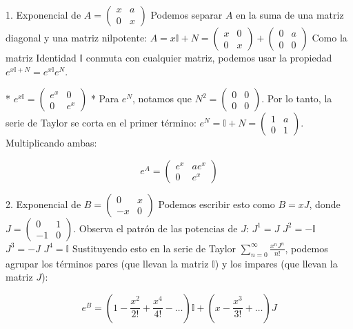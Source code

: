 \documentclass[11pt,spanish]{article}
\begin{document}
1. Exponencial de $A = \begin{pmatrix} x & a \\ 0 & x \end{pmatrix}$ 
Podemos separar $A$ en la suma de una matriz diagonal y una matriz nilpotente:
$A = x\mathbb{I} + N = \begin{pmatrix} x & 0 \\ 0 & x \end{pmatrix} + \begin{pmatrix} 0 & a \\ 0 & 0 \end{pmatrix}$
Como la matriz Identidad $\mathbb{I}$ conmuta con cualquier matriz, podemos usar la propiedad $e^{x\mathbb{I}+N} = e^{x\mathbb{I}}e^{N}$.

* $e^{x\mathbb{I}} = \begin{pmatrix} e^{x} & 0 \\ 0 & e^{x} \end{pmatrix}$
* Para $e^{N}$, notamos que $N^{2} = \begin{pmatrix} 0 & 0 \\ 0 & 0 \end{pmatrix}$. Por lo tanto, la serie de Taylor se corta en el primer término: $e^{N} = \mathbb{I} + N = \begin{pmatrix} 1 & a \\ 0 & 1 \end{pmatrix}$.
Multiplicando ambas:

$$e^{A} = \begin{pmatrix} e^{x} & a e^{x} \\ 0 & e^{x} \end{pmatrix}$$



2. Exponencial de $B = \begin{pmatrix} 0 & x \\ -x & 0 \end{pmatrix}$ 
Podemos escribir esto como $B = x J$, donde $J = \begin{pmatrix} 0 & 1 \\ -1 & 0 \end{pmatrix}$.
Observa el patrón de las potencias de $J$:
$J^{1} = J$
$J^{2} = -\mathbb{I}$
$J^{3} = -J$
$J^{4} = \mathbb{I}$
Sustituyendo esto en la serie de Taylor $\sum_{n=0}^{\infty} \frac{x^{n}J^{n}}{n!}$, podemos agrupar los términos pares (que llevan la matriz $\mathbb{I}$) y los impares (que llevan la matriz $J$):


$$e^{B} = \left( 1 - \frac{x^{2}}{2!} + \frac{x^{4}}{4!} - \dots \right)\mathbb{I} + \left( x - \frac{x^{3}}{3!} + \dots \right)J$$
\end{document}
